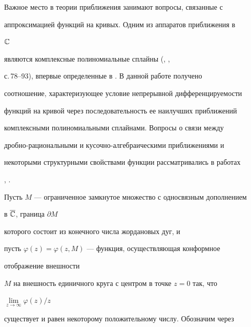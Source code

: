 \pagestyle{plain} %













\maketitle


\label{begin}





Важное место в теории приближения занимают вопросы, связанные с


аппроксимацией функций на кривых. Одним из аппаратов приближения в


$\Bbb C$


являются комплексные полиномиальные сплайны (\cite{1}, \cite{2},


с.\,78--93), впервые определенные в \cite{3}. В данной работе получено


соотношение, характеризующее условие непрерывной дифференцируемости


функций на кривой через последовательность ее наилучших приближений


комплексными полиномиальными сплайнами. Вопросы о связи между


дробно-рациональными и кусочно-алгебраическими приближениями и


некоторыми структурными свойствами функции рассматривались в работах


\cite{4}, \cite{5}.





Пусть $M$ --- ограниченное замкнутое множество с односвязным дополнением


в $\overline{\Bbb C}$, граница $\partial M$


которого состоит из конечного числа жордановых дуг, и


пусть $\varphi(z)=\varphi(z,M)$ --- функция, осуществляющая конформное


отображение внешности


$M$ на внешность единичного круга с центром в точке $z=0$ так, что


$\lim\limits_{z\to\infty}\varphi(z)/z$


существует и равен некоторому положительному числу. Обозначим через



